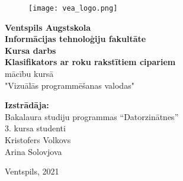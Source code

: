 \begin{titlepage}
    \begin{center}
        \begin{figure}[H]
            \centering
            \texttt{[image: vea\_logo.png]}
        \end{figure}
        \large
        \textbf{Ventspils Augstskola \\Informācijas tehnoloģiju fakultāte}
        \vspace*{4cm}
        \\
        \textbf{Kursa darbs} \\
        \LARGE
        \textbf{Klasifikators ar roku rakstītiem cipariem}
        \vspace{0.5cm}
        \large
        \\
        mācību kursā \\ "Vizuālās programmēšanas valodas"
    \end{center}

    \vspace{2cm}

    \begin{flushright}
        \normalsize
        \textbf{Izstrādāja:}\\
        Bakalaura studiju programmas “Datorzinātnes”\\
        3. kursa studenti\\
        Kristofers Volkovs \\
        Arina Solovjova \\
    \end{flushright}

    \vfill

    \begin{center}
        \Large
        Ventspils, 2021
    \end{center}

\end{titlepage}